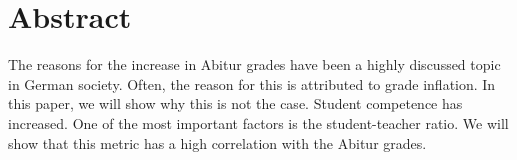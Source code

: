 \section*{Abstract}
The reasons for the increase in Abitur grades have been a highly discussed topic in German society. Often, the reason for this is attributed to grade inflation. In this paper, we will show why this is not the case. Student competence has increased. One of the most important factors is the student-teacher ratio. We will show that this metric has a high correlation with the Abitur grades.

